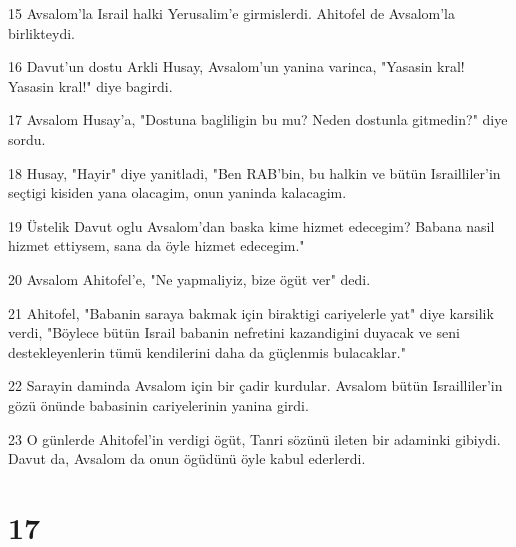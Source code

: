 \par 15 Avsalom'la Israil halki Yerusalim'e girmislerdi. Ahitofel de Avsalom'la birlikteydi.
\par 16 Davut'un dostu Arkli Husay, Avsalom'un yanina varinca, "Yasasin kral! Yasasin kral!" diye bagirdi.
\par 17 Avsalom Husay'a, "Dostuna bagliligin bu mu? Neden dostunla gitmedin?" diye sordu.
\par 18 Husay, "Hayir" diye yanitladi, "Ben RAB'bin, bu halkin ve bütün Israilliler'in seçtigi kisiden yana olacagim, onun yaninda kalacagim.
\par 19 Üstelik Davut oglu Avsalom'dan baska kime hizmet edecegim? Babana nasil hizmet ettiysem, sana da öyle hizmet edecegim."
\par 20 Avsalom Ahitofel'e, "Ne yapmaliyiz, bize ögüt ver" dedi.
\par 21 Ahitofel, "Babanin saraya bakmak için biraktigi cariyelerle yat" diye karsilik verdi, "Böylece bütün Israil babanin nefretini kazandigini duyacak ve seni destekleyenlerin tümü kendilerini daha da güçlenmis bulacaklar."
\par 22 Sarayin daminda Avsalom için bir çadir kurdular. Avsalom bütün Israilliler'in gözü önünde babasinin cariyelerinin yanina girdi.
\par 23 O günlerde Ahitofel'in verdigi ögüt, Tanri sözünü ileten bir adaminki gibiydi. Davut da, Avsalom da onun ögüdünü öyle kabul ederlerdi.

\chapter{17}

